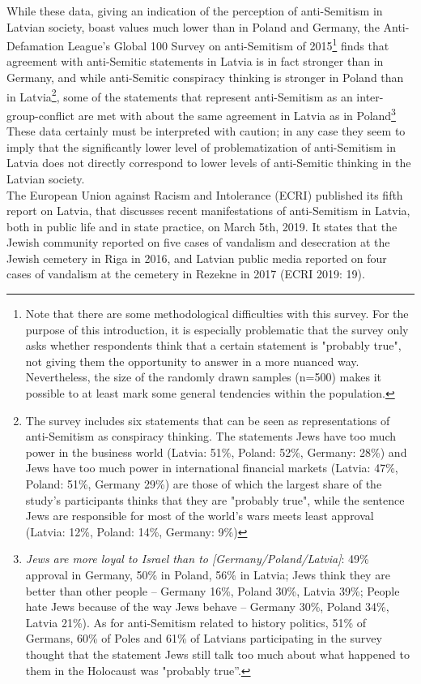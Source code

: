 While these data, giving an indication of the perception of anti-Semitism in Latvian society, boast values much lower than in Poland and Germany, the Anti-Defamation League’s Global 100 Survey on anti-Semitism of 2015\footnote{Note that there are some methodological difficulties with this survey. For the purpose of this introduction, it is especially problematic that the survey only asks whether respondents think that a certain statement is "probably true", not giving them the opportunity to answer in a more nuanced way. Nevertheless, the size of the randomly drawn samples (n=500) makes it possible to at least mark some general tendencies within the population.} finds that agreement with anti-Semitic statements in Latvia is in fact stronger than in Germany, and while anti-Semitic conspiracy thinking is stronger in Poland than in Latvia\footnote{The survey includes six statements that can be seen as representations of anti-Semitism as conspiracy thinking. The statements Jews have too much power in the business world (Latvia: 51\%, Poland: 52\%, Germany: 28\%) and Jews have too much power in international financial markets (Latvia: 47\%, Poland: 51\%, Germany 29\%) are those of which the largest share of the study’s participants thinks that they are "probably true", while the sentence Jews are responsible for most of the world's wars meets least approval (Latvia: 12\%, Poland: 14\%, Germany: 9\%)}, some of the statements that represent anti-Semitism as an inter-group-conflict are met with about the same agreement in Latvia as in Poland\footnote{\textit{Jews are more loyal to Israel than to [Germany/Poland/Latvia]}: 49\% approval in Germany, 50\% in Poland, 56\% in Latvia; Jews think they are better than other people – Germany 16\%, Poland 30\%, Latvia 39\%; People hate Jews because of the way Jews behave – Germany 30\%, Poland 34\%, Latvia 21\%). As for anti-Semitism related to history politics, 51\% of Germans, 60\% of Poles and 61\% of Latvians participating in the survey thought that the statement Jews still talk too much about what happened to them in the Holocaust was "probably true”.}  These data certainly must be interpreted with caution; in any case they seem to imply that the significantly lower level of problematization of anti-Semitism in Latvia does not directly correspond to lower levels of anti-Semitic thinking in the Latvian society.  \\
The European Union against Racism and Intolerance (ECRI) published its fifth report on Latvia, that discusses recent manifestations of anti-Semitism in Latvia, both in public life and in state practice, on March 5th, 2019. It states that the Jewish community reported on five cases of vandalism and desecration at the Jewish cemetery in Riga in 2016, and Latvian public media reported on four cases of vandalism at the cemetery in Rezekne in 2017 (ECRI 2019: 19). \\
